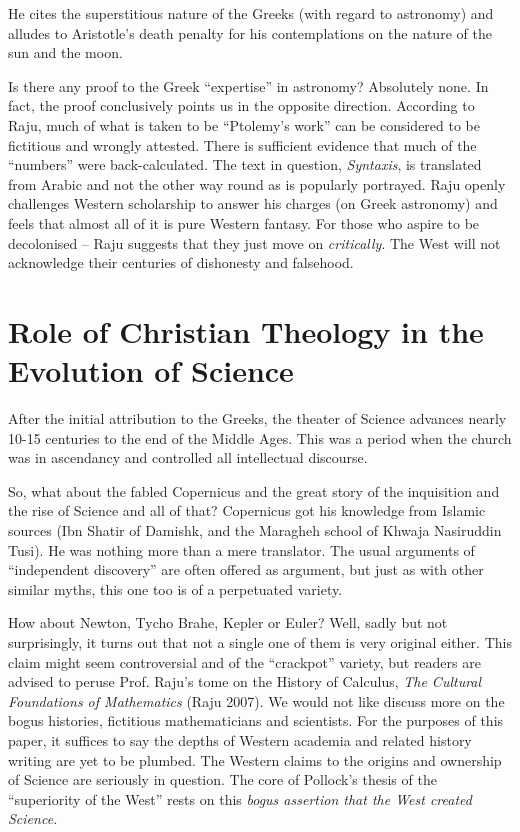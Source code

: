 He cites the superstitious nature of the Greeks (with regard to astronomy) and alludes to Aristotle’s death penalty for his contemplations on the nature of the sun and the moon.

Is there any proof to the Greek “expertise” in astronomy? Absolutely none. In fact, the proof conclusively points us in the opposite direction. According to Raju, much of what is taken to be “Ptolemy’s work” can be considered to be fictitious and wrongly attested. There is sufficient evidence that much of the “numbers” were back-calculated. The text in question, \textit{Syntaxis}, is translated from Arabic and not the other way round as is popularly portrayed. Raju openly challenges Western scholarship to answer his charges (on Greek astronomy) and feels that almost all of it is pure Western fantasy. For those who aspire to be decolonised – Raju suggests that they just move on \textit{critically}. The West will not acknowledge their centuries of dishonesty and falsehood.


\section*{Role of Christian Theology in the Evolution of Science}

After the initial attribution to the Greeks, the theater of Science advances nearly 10-15 centuries to the end of the Middle Ages. This was a period when the church was in ascendancy and controlled all intellectual discourse.

So, what about the fabled Copernicus and the great story of the inquisition and the rise of Science and all of that? Copernicus got his knowledge from Islamic sources (Ibn Shatir of Damishk, and the Maragheh school of Khwaja Nasiruddin Tusi). He was nothing more than a mere translator. The usual arguments of “independent discovery” are often offered as argument, but just as with other similar myths, this one too is of a perpetuated variety.

How about Newton, Tycho Brahe, Kepler or Euler? Well, sadly but not surprisingly, it turns out that not a single one of them is very original either. This claim might seem controversial and of the “crackpot” variety, but readers are advised to peruse Prof. Raju’s tome on the History of Calculus, \textit{The Cultural Foundations of Mathematics} (Raju 2007). We would not like discuss more on the bogus histories, fictitious mathematicians and scientists. For the purposes of this paper, it suffices to say the depths of Western academia and related history writing are yet to be plumbed. The Western claims to the origins and ownership of Science are seriously in question. The core of Pollock’s thesis of the “superiority of the West” rests on this \textit{bogus assertion that the West created Science.}

